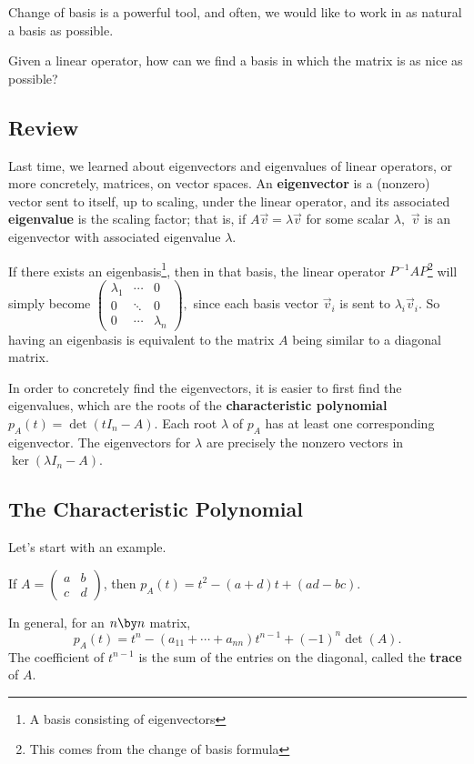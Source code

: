 Change of basis is a powerful tool, and often, we would like to work in as natural a basis as possible.

\begin{qq}
Given a linear operator, how can we find a basis in which the matrix is as nice as possible?
\end{qq}
\subsection{Review}
Last time, we learned about eigenvectors and eigenvalues of linear operators, or more concretely, matrices, on vector spaces. An \textbf{eigenvector} is a (nonzero) vector sent to itself, up to scaling, under the linear operator, and its associated \textbf{eigenvalue} is the scaling factor; that is, if $A\vec{v} = \lambda\vec{v}$ for some scalar $\lambda,$ $\vec{v}$ is an eigenvector with associated eigenvalue $\lambda.$

If there exists an eigenbasis\footnote{A basis consisting of eigenvectors}, then in that basis, the linear operator $P^{-1}AP$\footnote{This comes from the change of basis formula} will simply become $\begin{pmatrix}
\lambda_1 & \cdots & 0 \\
0 & \ddots & 0 \\
0 & \cdots & \lambda_n
\end{pmatrix},$ since each basis vector $\vec{v}_i$ is sent to $\lambda_i\vec{v}_i.$ So having an eigenbasis is equivalent to the matrix $A$ being similar to a diagonal matrix.

In order to concretely find the eigenvectors, it is easier to first find the eigenvalues, which are the roots of the \textbf{characteristic polynomial} $p_A(t) =\det\left(tI_n - A\right)$. Each root $\lambda$ of $p_A$ has at least one corresponding eigenvector. The eigenvectors for $\lambda$ are precisely the nonzero vectors in $\ker(\lambda I_n - A).$


\subsection{The Characteristic Polynomial}
Let's start with an example. 
\begin{example}
If $A = \begin{pmatrix}
a & b \\ c & d
\end{pmatrix}$, then $p_A(t) = t^2 - (a + d)t + (ad -bc).$
\end{example}
 In general, for an $n \by n$ matrix,
\[
p_A(t) = t^n - (a_{11} + \cdots + a_{nn}) t^{n-1} + (-1)^n \det(A).
\] The coefficient of $t^{n-1}$ is the sum of the entries on the diagonal, called the \textbf{trace} of $A.$ 

